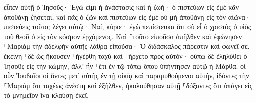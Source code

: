 \documentclass{openreader}
\begin{document}
εἶπεν αὐτῇ ὁ Ἰησοῦς· Ἐγώ εἰμι ἡ ἀνάστασις καὶ ἡ ζωή· ὁ πιστεύων εἰς ἐμὲ κἂν ἀποθάνῃ ζήσεται, 
καὶ πᾶς ὁ ζῶν καὶ πιστεύων εἰς ἐμὲ οὐ μὴ ἀποθάνῃ εἰς τὸν αἰῶνα· πιστεύεις τοῦτο; 
λέγει αὐτῷ· Ναί, κύριε· ἐγὼ πεπίστευκα ὅτι σὺ εἶ ὁ χριστὸς ὁ υἱὸς τοῦ θεοῦ ὁ εἰς τὸν κόσμον ἐρχόμενος. 
Καὶ ⸀τοῦτο εἰποῦσα ἀπῆλθεν καὶ ἐφώνησεν ⸀Μαριὰμ τὴν ἀδελφὴν αὐτῆς λάθρᾳ εἰποῦσα· Ὁ διδάσκαλος πάρεστιν καὶ φωνεῖ σε. 
ἐκείνη ⸀δὲ ὡς ἤκουσεν ⸀ἠγέρθη ταχὺ καὶ ⸀ἤρχετο πρὸς αὐτόν· 
οὔπω δὲ ἐληλύθει ὁ Ἰησοῦς εἰς τὴν κώμην, ἀλλ’ ἦν ⸀ἔτι ἐν τῷ τόπῳ ὅπου ὑπήντησεν αὐτῷ ἡ Μάρθα. 
οἱ οὖν Ἰουδαῖοι οἱ ὄντες μετ’ αὐτῆς ἐν τῇ οἰκίᾳ καὶ παραμυθούμενοι αὐτήν, ἰδόντες τὴν ⸀Μαριὰμ ὅτι ταχέως ἀνέστη καὶ ἐξῆλθεν, ἠκολούθησαν αὐτῇ ⸀δόξαντες ὅτι ὑπάγει εἰς τὸ μνημεῖον ἵνα κλαύσῃ ἐκεῖ. 
\end{document}
